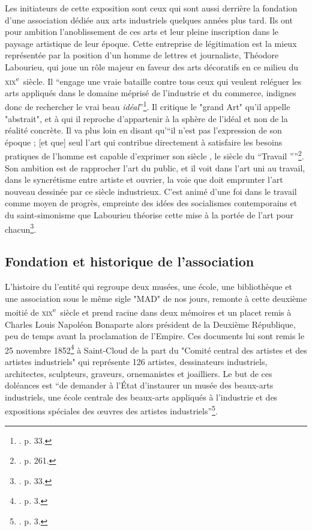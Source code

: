 Les initiateurs de cette exposition sont ceux qui sont aussi derrière la fondation d'une association dédiée aux arts industriels quelques années plus tard. Ils ont pour ambition l’anoblissement de ces arts et leur pleine inscription dans le paysage artistique de leur époque. Cette entreprise de légitimation est la mieux représentée par la position d'un homme de lettres et journaliste, Théodore Labourieu, qui joue un rôle majeur en faveur des arts décoratifs en ce milieu du \textsc{xix}\textsuperscript{e}~siècle. Il \enquote{engage une vraie bataille contre tous ceux qui veulent reléguer les arts appliqués dans le domaine méprisé de l'industrie et du commerce, indignes donc de rechercher le vrai beau \textit{idéal}}\footnote{\cite{froissart_union_1990}. p. 33.}. Il critique le "grand Art" qu'il appelle "abstrait", et à qui il reproche d'appartenir à la sphère de l'idéal et non de la réalité concrète. Il va plus loin en disant qu'\enquote{il n'est pas l'expression de son époque ; [et que] seul l'art qui contribue directement à satisfaire les besoins pratiques de l'homme est capable d'exprimer son siècle , le siècle du \textquotedblleft Travail \textquotedblright{}}\footnote{\cite{labourieu_art_1857}. p. 261.}.
Son ambition est de rapprocher l'art du public, et il voit dans l'art uni au travail, dans le syncrétisme entre artiste et ouvrier, la voie que doit emprunter l'art nouveau dessinée par ce siècle industrieux. C'est animé d'une foi dans le travail comme moyen de progrès, empreinte des idées des socialismes contemporains et du saint-simonisme que Labourieu théorise cette mise à la portée de l'art pour chacun\footnote{\cite{froissart_union_1990}. p. 33.}. 

\subsection{Fondation et historique de l'association}

L'histoire du l'entité qui regroupe deux musées, une école, une bibliothèque et une association sous le même sigle "MAD" de nos jours, remonte à cette deuxième moitié de \textsc{xix}\textsuperscript{e}~siècle et prend racine dans deux mémoires et un placet remis à Charles Louis Napoléon Bonaparte alors président de la Deuxième République, peu de temps avant la proclamation de l'Empire. Ces documents lui sont remis le 25 novembre 1852\footnote{\cite{noauthor_origines_nodate}. p. 3.} à Saint-Cloud de la part du "Comité central des artistes et des artistes industriels" qui représente 126 artistes, dessinateurs industriels, architectes, sculpteurs, graveurs, ornemanistes et joailliers. Le but de ces doléances est \enquote{de demander à l'État d'instaurer un musée des beaux-arts industriels, une école centrale des beaux-arts appliqués à l'industrie et des expositions spéciales des œuvres des artistes industriels}\footnote{\cite{noauthor_origines_nodate}. p. 3.}. 

